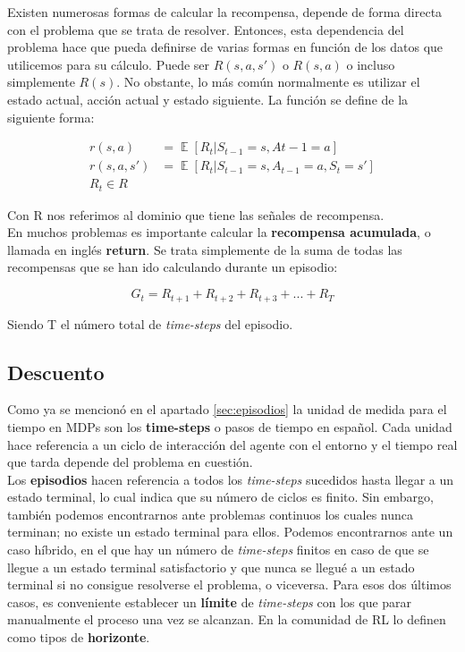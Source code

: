\documentclass[11pt,fleqn]{book} %
\DeclareMathOperator*{\E}{\mathbb{E}}
\begin{document}
Existen numerosas formas de calcular la recompensa, depende de forma directa con el problema que se trata de resolver. Entonces, esta dependencia del problema hace que pueda definirse de varias formas en función de los datos que utilicemos para su cálculo. Puede ser $R(s,a,s')$ o $R(s,a)$ o incluso simplemente $R(s)$. No obstante, lo más común normalmente es utilizar el estado actual, acción actual y estado siguiente. La función se define de la siguiente forma:

\begin{align*}
r(s,a)&=\E[R_t|S_{t-1}=s,A{t-1}=a]\\
r(s,a,s')&=\E[R_t|S_{t-1}=s,A_{t-1}=a,S_t=s']\\
R_t \in R
\end{align*}

Con R nos referimos al dominio que tiene las señales de recompensa.\\

En muchos problemas es importante calcular la \textbf{recompensa acumulada}, o llamada en inglés \textbf{return}. Se trata simplemente de la suma de todas las recompensas que se han ido calculando durante un episodio:

\begin{equation*}
G_t=R_{t+1}+R_{t+2}+R_{t+3}+...+R_T
\end{equation*}

Siendo T el número total de \textit{time-steps} del episodio.

\subsection{Descuento}

Como ya se mencionó en el apartado \ref{sec:episodios} la unidad de medida para el tiempo en MDPs son los \textbf{time-steps} o pasos de tiempo en español. Cada unidad hace referencia a un ciclo de interacción del agente con el entorno y el tiempo real que tarda depende del problema en cuestión. \\

Los \textbf{episodios} hacen referencia a todos los \textit{time-steps} sucedidos hasta llegar a un estado terminal, lo cual indica que su número de ciclos es finito. Sin embargo, también podemos encontrarnos ante problemas continuos los cuales nunca terminan; no existe un estado terminal para ellos. Podemos encontrarnos ante un caso híbrido, en el que hay un número de \textit{time-steps} finitos en caso de que se llegue a un estado terminal satisfactorio y que nunca se llegué a un estado terminal si no consigue resolverse el problema, o viceversa. Para esos dos últimos casos, es conveniente establecer un \textbf{límite} de \textit{time-steps} con los que parar manualmente el proceso una vez se alcanzan. En la comunidad de RL lo definen como tipos de \textbf{horizonte}.\\
\end{document}
